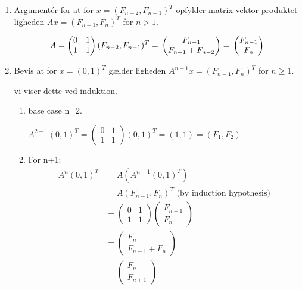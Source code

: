\documentclass{article}
\theoremstyle{definition}
\begin{document}
\begin{enumerate}
    \item Argumentér for at for $x = (F_{n-2}, F_{n-1})^T$ opfylder matrix-vektor produktet ligheden $Ax = (F_{n-1}, F_n)^T$ for $n > 1$.
    
    \[
    A = \begin{pmatrix} 0 & 1 \\ 1 & 1 \end{pmatrix} (F_{n-2}, F_{n-1})^T \\ = 
    \\ \begin{pmatrix} F_{n-1} \\ F_{n-1}+F_{n-2} \end{pmatrix} = \\
    \begin{pmatrix} F_{n-1} \\ F_{n} \end{pmatrix} 
    \]
    
    \item Bevis at for $x = (0,1)^T$ gælder ligheden $A^{n-1}x = (F_{n-1}, F_n)^T$ for $n \geq 1$. 
    
    vi viser dette ved induktion.

    \begin{enumerate}
        \item base case n=2. 
        
        $A^{2-1}(0,1)^T = \begin{pmatrix} 0 & 1 \\ 1 & 1 \end{pmatrix}(0,1)^T = (1, 1) = (F_{1}, F_2) $

        \item For n+1:
        \begin{align*}
        A^{n}(0,1)^T &= A(A^{n-1}(0,1)^T) \\
        &= A(F_{n-1}, F_n)^T \text{ (by induction hypothesis)} \\
        &= \begin{pmatrix} 0 & 1 \\ 1 & 1 \end{pmatrix} \begin{pmatrix} F_{n-1} \\ F_n \end{pmatrix} \\
        &= \begin{pmatrix} F_n \\ F_{n-1} + F_n \end{pmatrix} \\
        &= \begin{pmatrix} F_n \\ F_{n+1} \end{pmatrix}
        \end{align*}


\end{enumerate}
\end{enumerate}
\end{document}
